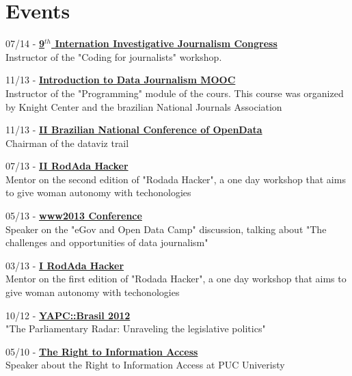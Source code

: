 \documentclass[]{friggeri-cv}
\begin{document}
\section{Events}
07/14 - \href{http://abraji.org.br/congresso/}{\textbf{9$^{th}$ Internation Investigative Journalism Congress}}\\
Instructor of the "Coding for journalists" workshop.

11/13 - \href{https://knightcenter.utexas.edu/pt-br/blog/00-14390-inscricoes-abertas-para-primeiro-curso-da-anj-com-o-centro-knight-introducao-ao-jornal}{\textbf{Introduction to Data Journalism MOOC}}\\
Instructor of the "Programming" module of the cours. This course was organized by Knight Center and the brazilian National Journals Association

11/13 - \href{http://2.encontro.dados.gov.br/encontro.html}{\textbf{II Brazilian National Conference of OpenData}}\\
Chairman of the dataviz trail

07/13 - \href{http://rodadahacker.com/}{\textbf{II RodAda Hacker}}\\
Mentor on the second edition of "Rodada Hacker", a one day workshop that aims to give woman autonomy with techonologies

05/13 - \href{http://www2013.org/}{\textbf{www2013 Conference}}\\
Speaker on the "eGov and Open Data Camp" discussion, talking about "The challenges and opportunities of data journalism"

03/13 - \href{http://rodadahacker.com/}{\textbf{I RodAda Hacker}}\\
Mentor on the first edition of "Rodada Hacker", a one day workshop that aims to give woman autonomy with techonologies

10/12 - \href{http://yapcbrasil.org.br/2012/talk/110}{\textbf{YAPC::Brasil 2012}}\\
"The Parliamentary Radar: Unraveling the legislative politics"

05/10 - \href{http://artigo19.org/infoedireitoseu/?p=560}{\textbf{The Right to Information Access}}\\
Speaker about the Right to Information Access at PUC Univeristy
%
%
\end{document}
